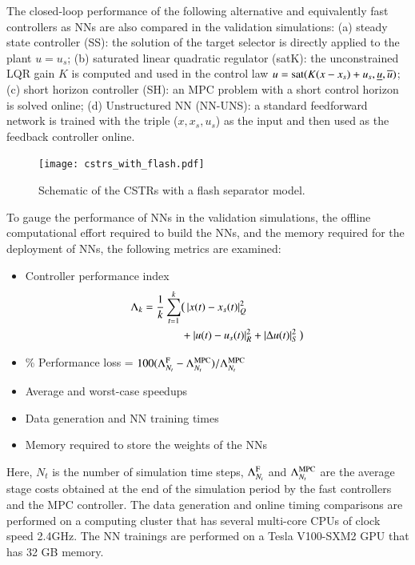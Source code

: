 \documentclass[preprint,5p, twocolumn, authoryear]{elsarticle}
\begin{document}
The closed-loop performance of the following alternative and equivalently fast
controllers as NNs are also compared in the validation simulations: (a) steady
state controller (SS): the solution of the target selector is directly applied
to the plant $u = u_s$; (b) saturated linear quadratic regulator (satK): the
unconstrained LQR gain $K$ is computed and used in the control law $u =
\textnormal{sat}(K(x-x_s) + u_s, \underline{u}, \overline{u})$; (c) short
horizon controller (SH): an MPC problem with a short control horizon is solved
online; (d) Unstructured NN (NN-UNS): a standard feedforward network is trained
with the triple ($x, x_s, u_s$) as the input and then used as the feedback
controller online.

\begin{figure}[h]
    \centering
    \texttt{[image: cstrs\_with\_flash.pdf]}
    \caption{Schematic of the CSTRs with a flash separator model.}
    \label{fig:schematic_cstrs}
\end{figure}

To gauge the performance of NNs in the validation simulations, the offline
computational effort required to build the NNs, and the memory required for the
deployment of NNs, the following metrics are examined:

\begin{itemize}
    \item Controller performance index
    \begin{align*}
    \Lambda_k = \dfrac{1}{k}\sum_{t=1}^{k} & \big(\left| x(t) - x_{s} (t) \right|^2_{Q} \\
        & + \left| u(t) - u_{s} (t) \right|^2_{R} + \left| \Delta u(t) \right|^2_{S}\big)         
    \end{align*}
    \item \% Performance loss = $100(\Lambda^{\textnormal{F}}_{N_{t}} -
    \Lambda^{\textnormal{MPC}}_{N_{t}})/\Lambda^{\textnormal{MPC}}_{N_{t}}$
    \item Average and worst-case speedups
    \item Data generation and NN training times
    \item Memory required to store the weights of the NNs
\end{itemize}
Here, $N_t$ is the number of simulation time steps,  
$\Lambda^{\textnormal{F}}_{N_{t}}$ and $\Lambda^{\textnormal{MPC}}_{N_{t}}$ are
the average stage costs obtained at the end of the simulation period by the fast
controllers and the MPC controller. The data generation and online timing
comparisons are performed on a computing cluster that has several multi-core
CPUs of clock speed 2.4GHz. The NN trainings are performed on a Tesla V100-SXM2
GPU that has 32 GB memory.
\end{document}

